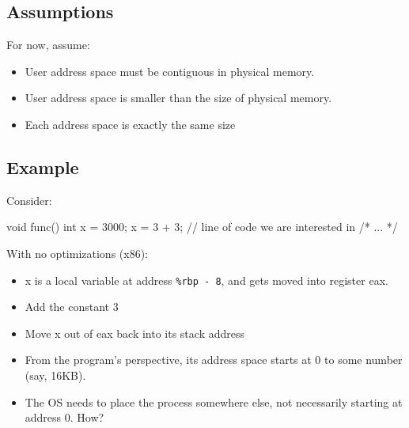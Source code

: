 \documentclass[11pt, a4paper]{article}
\theoremstyle{definition}
\theoremstyle{remark}
\begin{document}
\subsection{Assumptions}
For now, assume:
\begin{itemize}
  \item User address space must be contiguous in physical memory. 
  \item User address space is smaller than the size of physical memory. 
  \item Each address space is exactly the same size
\end{itemize}
\subsection{Example}
Consider:
\begin{ccode}
void func() {
  int x = 3000;
  x = 3 + 3; // line of code we are interested in
  /* ... */
}
\end{ccode}
With no optimizations (x86):
\begin{itemize}
  \item x is a local variable at address \texttt{\%rbp - 8}, and gets moved into register eax. 
  \item Add the constant 3 
  \item Move x out of eax back into its stack address
  \item From the program's perspective, its address space starts at 0 to some number (say, 16KB).
  \item The OS needs to place the process somewhere else, not necessarily starting at address 0. How?
\end{itemize}
\end{document}
